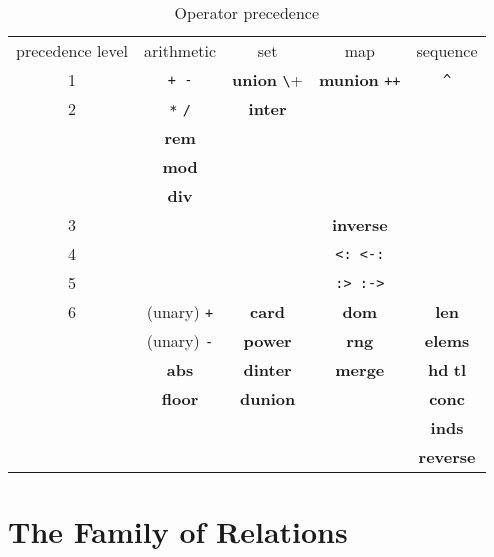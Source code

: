 \documentclass{overturerepchap}
\newcommand{\blankline}{\vspace{\baselineskip}}
\newcommand{\keyw}[1]{{\bf\ttfamily #1}}
\begin{document}
{\blankline
\begin{table}[thb]
\begin{center}
  \begin{tabular}{ccccc}
    \hline
    precedence level & arithmetic       & set                   & map                    & sequence \\
    1                & {\tt + -}        & \keyw{union} \verb+\+ & \keyw{munion} {\tt ++} & \verb+^+ \\
    2                & \verb+*+ {\tt /} & \keyw{inter}          &                        & \\
                     & \keyw{rem}       &                       &                        & \\
                     & \keyw{mod}       &                       &                        & \\
                     & \keyw{div}       &                       &                        & \\
    3                &                  &                       & \keyw{inverse}         & \\
    4                &                  &                       & {\tt <: <-:}           & \\
    5                &                  &                       & {\tt :> :->}           & \\
    6                & (unary) {\tt +}  & \keyw{card}           & \keyw{dom}             & \keyw{len}         \\
                     & (unary) {\tt -}  & \keyw{power}          & \keyw{rng}             & \keyw{elems}       \\
                     & \keyw{abs}       & \keyw{dinter}         & \keyw{merge}           & \keyw{hd} \keyw{tl} \\
                     & \keyw{floor}     & \keyw{dunion}         &                        & \keyw{conc}        \\
                     &                  &                       &                        & \keyw{inds}        \\
                     &                  &                       &                        & \keyw{reverse}        \\
    \hline
  \end{tabular}
\end{center}
\caption{Operator precedence}
\end{table}

\section{The Family of Relations}

}
\end{document}
